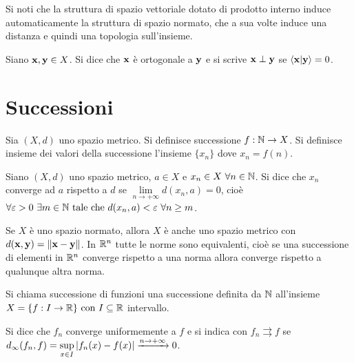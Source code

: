 \begin{remark}
    Si noti che la struttura di spazio vettoriale dotato di prodotto interno induce automaticamente la struttura di spazio normato, che a sua volte induce una distanza e quindi una topologia sull'insieme.
\end{remark}

\begin{definition}
    [Ortogonale]
    Siano $\vb{x}, \vb{y} \in X$. Si dice che $\vb{x}$ è ortogonale a $\vb{y}$ e si scrive $\vb{x} \perp \vb{y}$ se $\ip{\vb{x}}{\vb{y}}=0$.
\end{definition}

\section{Successioni}

\begin{definition}
    Sia $(X, d)$ uno spazio metrico. Si definisce successione $f: \mathbb{N} \to X$. Si definisce insieme dei valori della successione l'insieme $\{x_n\}$ dove $x_n = f(n)$.
\end{definition}

\begin{definition}
    Siano $(X, d)$ uno spazio metrico, $a \in X$ e $x_n \in X \ \forall n \in \mathbb{N}$. Si dice che $x_n$ converge ad $a$ rispetto a $d$ se $\lim\limits_{n \to + \infty}d(x_n, a) = 0$, cioè $\forall \varepsilon > 0 \ \exists m \in \mathbb{N} \text{ tale che } d(x_n, a) < \varepsilon \ \forall n \geq m$.
\end{definition}

\begin{remark}
    Se $X$ è uno spazio normato, allora $X$ è anche uno spazio metrico con $d(\vb{x},\vb{y}) = \norm{\vb{x}-\vb{y}}$. In $\mathbb{R}^n$ tutte le norme sono equivalenti, cioè se una successione di elementi in $\mathbb{R}^n$ converge rispetto a una norma allora converge rispetto a qualunque altra norma.
\end{remark}

\begin{definition}
    Si chiama successione di funzioni una successione definita da $\mathbb{N}$ all'insieme $X=\{f: I \to \mathbb{R}\} \text{ con } I \subseteq \mathbb{R}$ intervallo.
\end{definition}

\begin{definition}
    \label{def:unif_conv}
    Si dice che $f_n$ converge uniformemente a $f$ e si indica con $f_n \rightrightarrows f$ se $d_\infty(f_n, f) = \sup\limits_{x \in I}\abs{f_n(x) - f(x)} \xrightarrow{n \to + \infty} 0$.
\end{definition}

